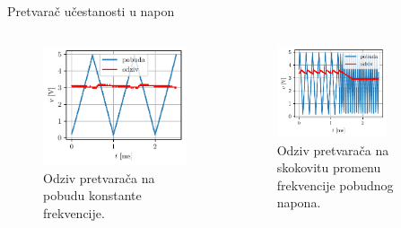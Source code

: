 \documentclass[aspectratio=169,xcolor=dvipsnames]{beamer}
\begin{document}
\begin{frame}{Pretvarač učestanosti u napon}
	\begin{columns}[c]
    \begin{column}{.5\textwidth}
    \begin{figure}
        \centering
        \includegraphics[scale = 0.75]{fig/FV1000s.pdf}
        \caption{Odziv pretvarača na pobudu konstante frekvencije.}
    \end{figure}      
    \end{column}
    \begin{column}{.5\textwidth}
    \begin{figure}
        \centering
        \includegraphics[width=0.75\textwidth]{fig/FV1000d.pdf}
        \caption{Odziv pretvarača na skokovitu promenu frekvencije pobudnog napona.}
    \end{figure}
    \end{column}
\end{columns}
\end{frame}
\end{document}
